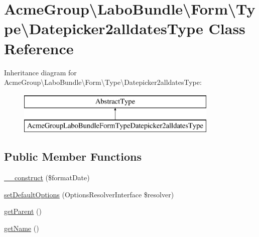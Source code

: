 \hypertarget{class_acme_group_1_1_labo_bundle_1_1_form_1_1_type_1_1_datepicker2alldates_type}{\section{Acme\+Group\textbackslash{}Labo\+Bundle\textbackslash{}Form\textbackslash{}Type\textbackslash{}Datepicker2alldates\+Type Class Reference}
\label{class_acme_group_1_1_labo_bundle_1_1_form_1_1_type_1_1_datepicker2alldates_type}
}
Inheritance diagram for Acme\+Group\textbackslash{}Labo\+Bundle\textbackslash{}Form\textbackslash{}Type\textbackslash{}Datepicker2alldates\+Type\+:\begin{figure}[H]
\begin{center}
\leavevmode
\includegraphics[height=2.000000cm]{class_acme_group_1_1_labo_bundle_1_1_form_1_1_type_1_1_datepicker2alldates_type}
\end{center}
\end{figure}
\subsection*{Public Member Functions}
\begin{DoxyCompactItemize}
\item 
\hyperlink{class_acme_group_1_1_labo_bundle_1_1_form_1_1_type_1_1_datepicker2alldates_type_a7b799d15cdd7f64cf3288a3b48ebb173}{\+\_\+\+\_\+construct} (\$format\+Date)
\item 
\hyperlink{class_acme_group_1_1_labo_bundle_1_1_form_1_1_type_1_1_datepicker2alldates_type_aec032cc138e8745697d978c2305478e4}{set\+Default\+Options} (Options\+Resolver\+Interface \$resolver)
\item 
\hyperlink{class_acme_group_1_1_labo_bundle_1_1_form_1_1_type_1_1_datepicker2alldates_type_ad9482950a132dde0ebafff991900155d}{get\+Parent} ()
\item 
\hyperlink{class_acme_group_1_1_labo_bundle_1_1_form_1_1_type_1_1_datepicker2alldates_type_ac78e8ccc543f73a0783e5d312a339abd}{get\+Name} ()
\end{DoxyCompactItemize}


